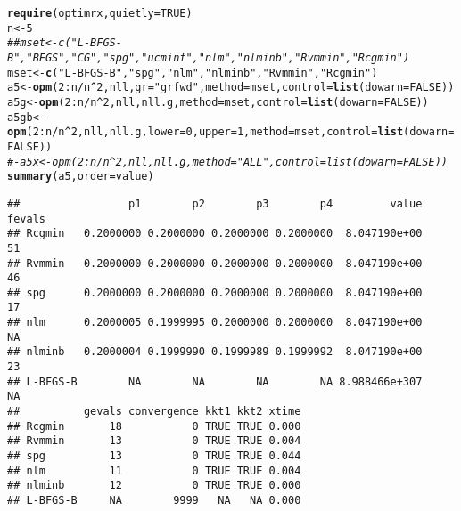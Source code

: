 \documentclass[11pt]{article}\usepackage[]{graphicx}\usepackage[]{color}
\makeatletter
\newcommand{\hlnum}[1]{\textcolor[rgb]{0.686,0.059,0.569}{#1}}%
\newcommand{\hlstr}[1]{\textcolor[rgb]{0.192,0.494,0.8}{#1}}%
\newcommand{\hlcom}[1]{\textcolor[rgb]{0.678,0.584,0.686}{\textit{#1}}}%
\newcommand{\hlopt}[1]{\textcolor[rgb]{0,0,0}{#1}}%
\newcommand{\hlstd}[1]{\textcolor[rgb]{0.345,0.345,0.345}{#1}}%
\newcommand{\hlkwb}[1]{\textcolor[rgb]{0.69,0.353,0.396}{#1}}%
\newcommand{\hlkwc}[1]{\textcolor[rgb]{0.333,0.667,0.333}{#1}}%
\newcommand{\hlkwd}[1]{\textcolor[rgb]{0.737,0.353,0.396}{\textbf{#1}}}%
\newenvironment{kframe}{%
 \def\at@end@of@kframe{}%
 \ifinner\ifhmode%
  \def\at@end@of@kframe{\end{minipage}}%
  \begin{minipage}{\columnwidth}%
 \fi\fi%
 \def\FrameCommand##1{\hskip\@totalleftmargin \hskip-\fboxsep
 \colorbox{shadecolor}{##1}\hskip-\fboxsep
     \hskip-\linewidth \hskip-\@totalleftmargin \hskip\columnwidth}%
 \MakeFramed {\advance\hsize-\width
   \@totalleftmargin\z@ \linewidth\hsize
   \@setminipage}}%
 {\par\unskip\endMakeFramed%
 \at@end@of@kframe}
\newenvironment{knitrout}{}{} %
\makeatother
\begin{document}
\begin{knitrout}\scriptsize
{}\color{fgcolor}\begin{kframe}
\begin{alltt}
\hlkwd{require}\hlstd{(optimrx,} \hlkwc{quietly}\hlstd{=}\hlnum{TRUE}\hlstd{)}
\hlstd{n}\hlkwb{<-}\hlnum{5}
\hlcom{## mset<-c("L-BFGS-B", "BFGS", "CG", "spg", "ucminf", "nlm", "nlminb", "Rvmmin", "Rcgmin")}
\hlstd{mset}\hlkwb{<-}\hlkwd{c}\hlstd{(}\hlstr{"L-BFGS-B"}\hlstd{,} \hlstr{"spg"}\hlstd{,} \hlstr{"nlm"}\hlstd{,} \hlstr{"nlminb"}\hlstd{,} \hlstr{"Rvmmin"}\hlstd{,} \hlstr{"Rcgmin"}\hlstd{)}
\hlstd{a5}\hlkwb{<-}\hlkwd{opm}\hlstd{(}\hlnum{2}\hlopt{:}\hlstd{n}\hlopt{/}\hlstd{n}\hlopt{^}\hlnum{2}\hlstd{, nll,} \hlkwc{gr}\hlstd{=}\hlstr{"grfwd"}\hlstd{,} \hlkwc{method}\hlstd{=mset,} \hlkwc{control}\hlstd{=}\hlkwd{list}\hlstd{(}\hlkwc{dowarn}\hlstd{=}\hlnum{FALSE}\hlstd{))}
\hlstd{a5g}\hlkwb{<-}\hlkwd{opm}\hlstd{(}\hlnum{2}\hlopt{:}\hlstd{n}\hlopt{/}\hlstd{n}\hlopt{^}\hlnum{2}\hlstd{, nll, nll.g,} \hlkwc{method}\hlstd{=mset,} \hlkwc{control}\hlstd{=}\hlkwd{list}\hlstd{(}\hlkwc{dowarn}\hlstd{=}\hlnum{FALSE}\hlstd{))}
\hlstd{a5gb}\hlkwb{<-}\hlkwd{opm}\hlstd{(}\hlnum{2}\hlopt{:}\hlstd{n}\hlopt{/}\hlstd{n}\hlopt{^}\hlnum{2}\hlstd{, nll, nll.g,} \hlkwc{lower}\hlstd{=}\hlnum{0}\hlstd{,} \hlkwc{upper}\hlstd{=}\hlnum{1}\hlstd{,} \hlkwc{method}\hlstd{=mset,} \hlkwc{control}\hlstd{=}\hlkwd{list}\hlstd{(}\hlkwc{dowarn}\hlstd{=}\hlnum{FALSE}\hlstd{))}
\hlcom{#- a5x <- opm(2:n/n^2, nll, nll.g, method="ALL", control=list(dowarn=FALSE))}
\hlkwd{summary}\hlstd{(a5,}\hlkwc{order}\hlstd{=value)}
\end{alltt}
\begin{verbatim}
##                 p1        p2        p3        p4         value fevals
## Rcgmin   0.2000000 0.2000000 0.2000000 0.2000000  8.047190e+00     51
## Rvmmin   0.2000000 0.2000000 0.2000000 0.2000000  8.047190e+00     46
## spg      0.2000000 0.2000000 0.2000000 0.2000000  8.047190e+00     17
## nlm      0.2000005 0.1999995 0.2000000 0.2000000  8.047190e+00     NA
## nlminb   0.2000004 0.1999990 0.1999989 0.1999992  8.047190e+00     23
## L-BFGS-B        NA        NA        NA        NA 8.988466e+307     NA
##          gevals convergence kkt1 kkt2 xtime
## Rcgmin       18           0 TRUE TRUE 0.000
## Rvmmin       13           0 TRUE TRUE 0.004
## spg          13           0 TRUE TRUE 0.044
## nlm          11           0 TRUE TRUE 0.004
## nlminb       12           0 TRUE TRUE 0.000
## L-BFGS-B     NA        9999   NA   NA 0.000
\end{verbatim}

\end{kframe}
\end{knitrout}
\end{document}

